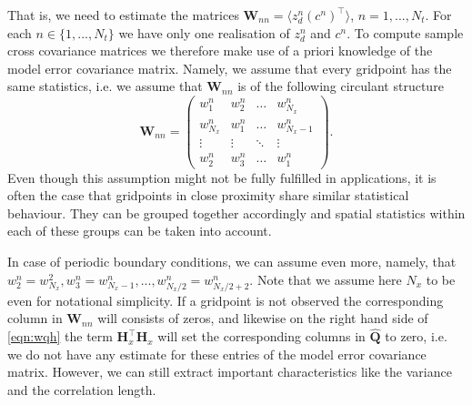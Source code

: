 \documentclass[a4paper,10pt]{article}
\numberwithin{equation}{section}
\begin{document}
That is, we need to estimate the matrices $\mathbf W_{nn}=\langle z_d^n(c^n)^\top\rangle$, $n=1,...,N_t$.
For each $n\in \{1,...,N_t\}$ we have only one realisation of $z_d^n$ and $c^n$. To compute sample cross covariance matrices we therefore make use of a priori knowledge of the model error covariance matrix. Namely, we assume that every gridpoint has the same statistics, i.e. we assume that $\mathbf W_{nn}$ is of the following circulant structure 
\begin{equation}\mathbf W_{nn}=\begin{pmatrix} w_{1}^n &w_{2}^n&\hdots&w_{N_x}^n\\ w_{N_x}^n&w_{1}^n&\hdots&w_{N_x-1}^n\\ \vdots &\vdots &\ddots & \vdots\\ w_{2}^n&w_{3}^n&\hdots &w_{1}^n\end{pmatrix}.
\label{eqn:Wm}
\end{equation}
Even though this assumption might not be fully fulfilled in applications, it is often the case that gridpoints in close proximity share similar statistical behaviour. They can be grouped together accordingly and spatial statistics within each of these groups can be taken into account. 

In case of periodic boundary conditions, we can assume even more, namely, that  $w_{2}^n=w_{N_x}^2, w_3^n=w_{N_x-1}^n,...,w_{N_x/2}^n=w_{N_x/2+2}^n$. Note that we assume here $N_x$ to be even for notational simplicity. 
If a gridpoint is not observed the corresponding column in $\mathbf W_{nn}$ will consists of zeros, and likewise on the right hand side of \eqref{eqn:wqh} the term $\mathbf H_x^\top \mathbf H_x$ will set the corresponding columns in $\hat {\mathbf Q}$ to zero, i.e. we do not have any estimate for these entries of the model error covariance matrix. However, we can still extract important characteristics like the variance and the correlation length. 
\end{document}
